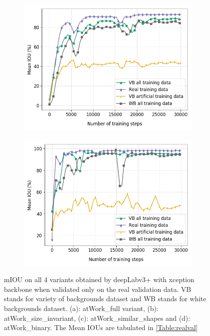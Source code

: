 \begin{figure}
\begin{subfigure}{.5\textwidth}
			\includegraphics[width=1\linewidth]{images/re_val_xcep_shape}
			\caption{}
		\end{subfigure}
		\begin{subfigure}{.5\textwidth}
			\centering
			\includegraphics[width=1\linewidth]{images/re_val_xcep_binary}
			\caption{}
		\end{subfigure}
		\caption{mIOU on all 4 variants obtained by deepLabv3+ with xception backbone when validated only on the real validation data. VB stands for variety of backgrounds dataset and WB stands for white backgrounds dataset. (a): atWork\_full variant, (b): atWork\_size\_invariant, (c): atWork\_similar\_shapes and (d): atWork\_binary. The Mean IOUs are tabulated in \ref{Table:realval}}
		\label{Fig:realvalxcep}
	\end{figure}

